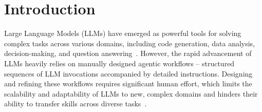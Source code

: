 \section{Introduction}







Large Language Models (LLMs) have emerged as powerful tools for solving complex tasks across various domains, including code generation, data analysis, decision-making, and question answering~\citep{DBLP:journals/corr/abs-2408-05109, bo2024nlsql, DBLP:journals/corr/abs-2406-07815, yu2024hai, sun2024chatbot, wangchain, song2023llm, xietravelplanner, li2024debug}. However, the rapid advancement of LLMs heavily relies on manually designed agentic workflows -- structured sequences of LLM invocations accompanied by detailed instructions. Designing and refining these workflows requires significant human effort, which limits the scalability and adaptability of LLMs to new, complex domains and hinders their ability to transfer skills across diverse tasks~\citep{DBLP:conf/cidr/0001YF0LH24}.

